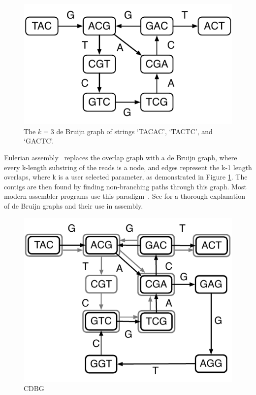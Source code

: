 \begin{figure}[!hbt]
	\begin{center}
		\includegraphics[scale=0.7]{images/dbg.pdf}
		\caption{The $k=3$ de Bruijn graph of strings `TACAC', `TACTC', and
			`GACTC'.}
		\label{figure:dbg}
	\end{center}
\end{figure}

Eulerian assembly~\cite{IW95, PTW} replaces the overlap graph with a de Bruijn graph, where every k-length substring of the reads is a node, and edges represent the k-1 length overlaps, where k is a user selected parameter, as demonstrated in Figure \ref{figure:dbg}. The contigs are then found by finding non-branching paths through this graph. Most modern assembler programs use this paradigm~\cite{bankevich2012spades,peng2010idba,Li:2010,Simpson:2009,Butler:2008,Zerbino:2008,SahShi12,MacPrz09}. See \cite{compeau11} for a thorough explanation of de Bruijn graphs and their use in assembly.



\begin{figure}[!hbt]
	\begin{center}
		\includegraphics*[scale=0.70]{images/cdbg.pdf}
		\caption{CDBG}
		\label{figure:cdbg}
	\end{center}
\end{figure}


